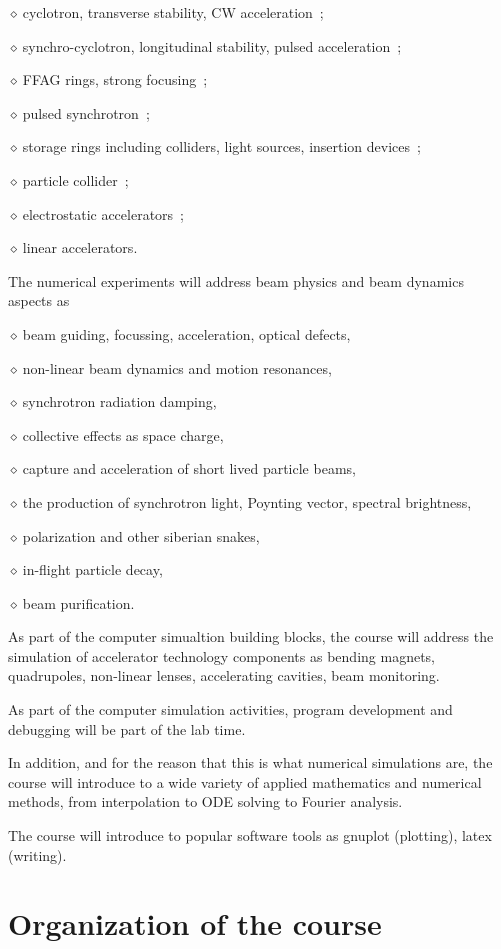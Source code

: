 \documentclass[12pt]{article}
\newcommand{\sid}{{\small \ensuremath{\diamond~}}}
\begin{document}
\sid cyclotron, transverse stability, CW acceleration~;

\sid synchro-cyclotron,  longitudinal stability,  pulsed acceleration~; 

\sid FFAG rings, strong focusing~;  

\sid pulsed synchrotron~; 

\sid storage rings including colliders, light sources,  insertion devices~; 

\sid particle collider~; 

\sid electrostatic accelerators~; 

\sid linear accelerators. 


The numerical experiments will address  beam physics and beam dynamics aspects as 

\sid beam guiding, focussing, acceleration, optical defects,

\sid non-linear beam dynamics and motion resonances, 

\sid  synchrotron radiation damping, 

\sid collective effects as space charge,

\sid capture and acceleration of short lived particle beams, 

\sid the production of synchrotron light,  Poynting vector, spectral brightness, 

\sid  polarization and other siberian snakes, 

\sid in-flight particle decay,

\sid  beam purification. 


As part of the computer simualtion building blocks, 
the course  will address the simulation of accelerator technology components as bending magnets, quadrupoles, 
non-linear lenses, accelerating cavities, beam monitoring.

As part of the computer simulation activities,  program development and debugging will be part of the lab time. 

\bigskip

In addition, and for the reason that this is what numerical simulations are,  
the course will  introduce to a wide variety of applied mathematics and numerical methods, from 
interpolation  to ODE solving to Fourier analysis. 

The course will introduce to popular software tools as  gnuplot (plotting),  latex (writing). 

\bigskip

\section*{Organization of the course}
\end{document}
